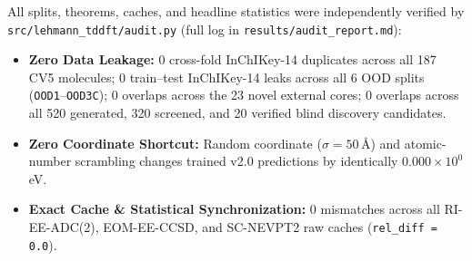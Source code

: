 \documentclass[10pt,a4paper]{article}
\begin{document}
All splits, theorems, caches, and headline statistics were independently verified by \texttt{src/lehmann\_tddft/audit.py} (full log in \texttt{results/audit\_report.md}):
\begin{itemize}
  \item \textbf{Zero Data Leakage:} 0 cross-fold InChIKey-14 duplicates across all 187 CV5 molecules; 0 train--test InChIKey-14 leaks across all 6 OOD splits (\texttt{OOD1}--\texttt{OOD3C}); 0 overlaps across the 23 novel external cores; 0 overlaps across all 520 generated, 320 screened, and 20 verified blind discovery candidates.
  \item \textbf{Zero Coordinate Shortcut:} Random coordinate ($\sigma=50$\,\AA) and atomic-number scrambling changes trained v2.0 predictions by identically $0.000\times 10^0$\,eV.
  \item \textbf{Exact Cache \& Statistical Synchronization:} 0 mismatches across all RI-EE-ADC(2), EOM-EE-CCSD, and SC-NEVPT2 raw caches (\texttt{rel\_diff = 0.0}).
\end{itemize}
\end{document}
